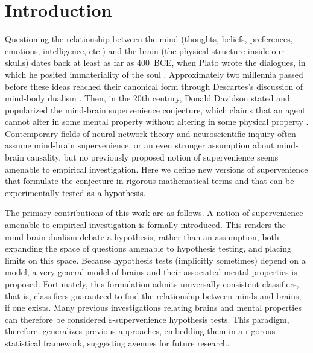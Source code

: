 \documentclass{article}
\newcommand{\eps}{\varepsilon}
\providecommand{\tr}[1]{\textcolor{black}{#1}}
\begin{document}
\vspace*{0.5 in}


\section{Introduction}

Questioning the relationship between the mind (thoughts, beliefs, preferences, emotions, intelligence, etc.) and the brain (the physical structure inside our skulls) dates back at least as far as 400~BCE, when Plato wrote the dialogues, in which he posited immateriality of the soul \cite{Plato97}. Approximately two millennia passed before these ideas reached their canonical form through Descartes's discussion of mind-body dualism \cite{Descartes1641}. Then, in the 20th century, Donald Davidson stated and popularized the mind-brain supervenience \tr{conjecture}, which claims that an agent cannot alter in some mental property without altering in some physical property \cite{Davidson70}. Contemporary fields of neural network theory and neuroscientific inquiry often assume mind-brain supervenience, or an even stronger assumption about mind-brain causality, but no previously proposed notion of supervenience seems amenable to empirical investigation. Here we define new versions of supervenience that formulate the \tr{conjecture} in rigorous mathematical terms and that can be experimentally tested \tr{as a hypothesis}.

The primary contributions of this work are as follows.  A notion of supervenience amenable to empirical investigation is formally introduced.  This renders the mind-brain dualism debate a hypothesis, rather than an assumption, both expanding the space of questions amenable to hypothesis testing, and placing limits on this space.  Because hypothesis tests (implicitly sometimes) depend on a model, a very general model of brains and their associated mental properties is proposed.  Fortunately, this formulation admits universally consistent classifiers, that is, classifiers guaranteed to find the relationship between minds and brains, if one exists.  Many previous investigations relating brains and mental properties can therefore be considered $\eps$-supervenience hypothesis tests.  This paradigm, therefore, generalizes previous approaches, embedding them in a rigorous statistical framework, suggesting avenues for future research.


\end{document}
